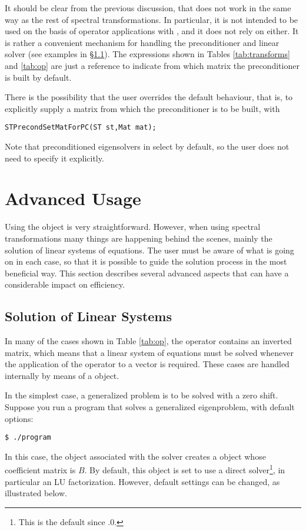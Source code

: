 	It should be clear from the previous discussion, that  does not work in the same way as the rest of spectral transformations. In particular, it is not intended to be used on the basis of operator applications with , and it does not rely on  either. It is rather a convenient mechanism for handling the preconditioner and linear solver (see examples in \S\ref{sec:lin}). The expressions shown in Tables \ref{tab:transforms} and \ref{tab:op} are just a reference to indicate from which matrix the preconditioner is built by default.

	There is the possibility that the user overrides the default behaviour, that is, to explicitly supply a matrix from which the preconditioner is to be built, with
	\begin{Verbatim}[fontsize=\small]
	STPrecondSetMatForPC(ST st,Mat mat);
	\end{Verbatim}

	Note that preconditioned eigensolvers in  select  by default, so the user does not need to specify it explicitly.

\section{Advanced Usage}

Using the  object is very straightforward. However, when using spectral transformations many things are happening behind the scenes, mainly the solution of linear systems of equations. The user must be aware of what is going on in each case, so that it is possible to guide the solution process in the most beneficial way. This section describes several advanced aspects that can have a considerable impact on efficiency.

\subsection{Solution of Linear Systems}
\label{sec:lin}

	In many of the cases shown in Table \ref{tab:op}, the operator contains an inverted matrix, which means that a linear system of equations must be solved whenever the application of the operator to a vector is required. These cases are handled internally by means of a  object.

	In the simplest case, a generalized problem is to be solved with a zero shift. Suppose you run a program that solves a generalized eigenproblem, with default options:
\begin{Verbatim}[fontsize=\small]
	$ ./program
\end{Verbatim}
In this case, the  object associated with the  solver creates a  object whose coefficient matrix is $B$. By default, this  object is set to use a direct solver\footnote{This is the default since .0.}, in particular an LU factorization. However, default settings can be changed, as illustrated below.

